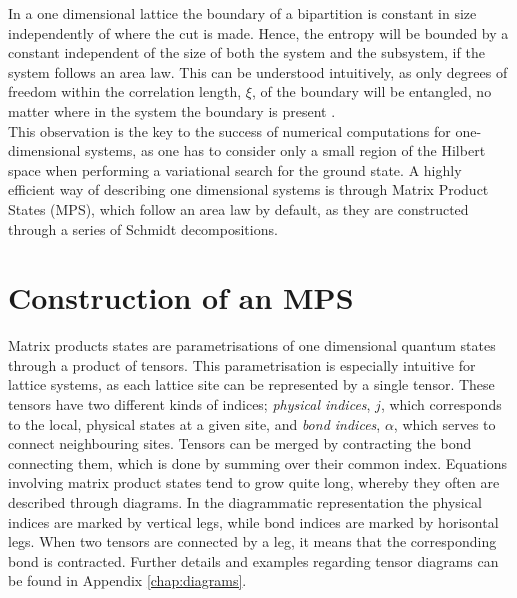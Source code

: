 In a one dimensional lattice the boundary of a bipartition is constant in size independently of where the cut is made. Hence, the entropy will be bounded by a constant independent of the size of both the system and the subsystem, if the system follows an area law. This can be understood intuitively, as only degrees of freedom within the correlation length, $\xi$, of the boundary will be entangled, no matter where in the system the boundary is present \cite{Hastings2007}.\\
This observation is the key to the success of numerical computations for one-dimensional systems, as one has to consider only a small region of the Hilbert space when performing a variational search for the ground state. A highly efficient way of describing one dimensional systems is through Matrix Product States (MPS), which follow an area law by default, as they are constructed through a series of Schmidt decompositions.


\section{Construction of an MPS} \label{sec:construct_MPS}
Matrix products states are parametrisations of one dimensional quantum states through a product of tensors. This parametrisation is especially intuitive for lattice systems, as each lattice site can be represented by a single tensor. These tensors have two different kinds of indices; \textit{physical indices}, $j$, which corresponds to the local, physical states at a given site, and \textit{bond indices}, $\alpha$, which serves to connect neighbouring sites. Tensors can be merged by contracting the bond connecting them, which is done by summing over their common index. Equations involving matrix product states tend to grow quite long, whereby they often are described through diagrams. In the diagrammatic representation the physical indices are marked by vertical legs, while bond indices are marked by horisontal legs. When two tensors are connected by a leg, it means that the corresponding bond is contracted. Further details and examples regarding tensor diagrams can be found in Appendix \ref{chap:diagrams}.\\

